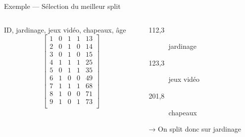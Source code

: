 \begin{frame}{Exemple — Sélection du meilleur split}
  \begin{columns}
    \begin{column}{.5\textwidth}
      ID, jardinage, jeux vidéo, chapeaux, âge
      \[
        \begin{bmatrix}
          1 & 0 & 1 & 1 & 13  \\
          2 & 0 & 1 & 0 & 14 \\
          3 & 0 & 1 & 0 & 15 \\
          4 & 1 & 1 & 1 & 25 \\
          5 & 0 & 1 & 1 & 35 \\
          6 & 1 & 0 & 0 & 49 \\
          7 & 1 & 1 & 1 & 68 \\
          8 & 1 & 0 & 0 & 71 \\
          9 & 1 & 0 & 1 & 73 \\
        \end{bmatrix}
      \]
    \end{column}
    \begin{column}{.5\textwidth}
      \begin{description}
        \item[112,3] jardinage
        \item[123,3] jeux vidéo
        \item[201,8] chapeaux
      \end{description}
      → On split donc sur jardinage
    \end{column}
  \end{columns}
\end{frame}

